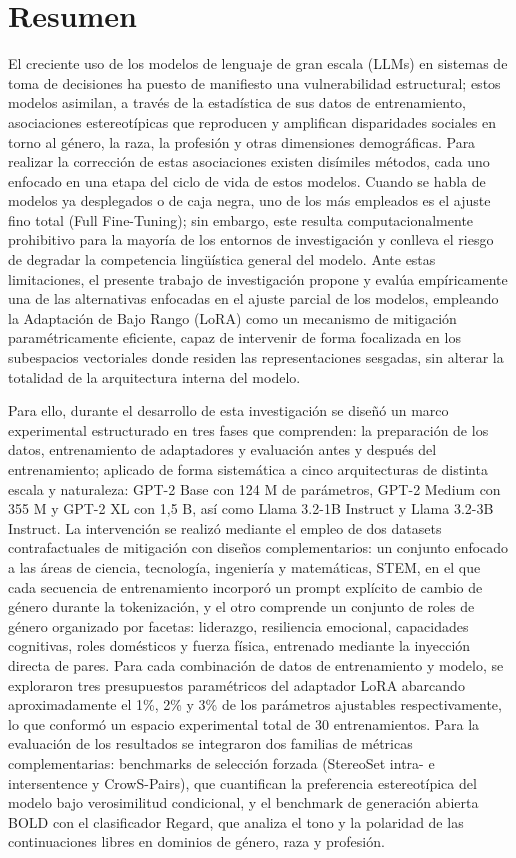 \documentclass[12pt,a4paper]{report}
\begin{document}
\section*{Resumen}

El creciente uso de los modelos de lenguaje de gran escala (LLMs) en sistemas de toma de decisiones ha puesto de manifiesto una vulnerabilidad estructural; estos modelos asimilan, a través de la estadística de sus datos de entrenamiento, asociaciones estereotípicas que reproducen y amplifican disparidades sociales en torno al género, la raza, la profesión y otras dimensiones demográficas. Para realizar la corrección de estas asociaciones existen disímiles métodos, cada uno enfocado en una etapa del ciclo de vida de estos modelos. Cuando se habla de modelos ya desplegados o de caja negra, uno de los más empleados es el ajuste fino total (Full Fine-Tuning); sin embargo, este resulta computacionalmente prohibitivo para la mayoría de los entornos de investigación y conlleva el riesgo de degradar la competencia lingüística general del modelo. Ante estas limitaciones, el presente trabajo de investigación propone y evalúa empíricamente una de las alternativas enfocadas en el ajuste parcial de los modelos, empleando la Adaptación de Bajo Rango (LoRA) como un mecanismo de mitigación paramétricamente eficiente, capaz de intervenir de forma focalizada en los subespacios vectoriales donde residen las representaciones sesgadas, sin alterar la totalidad de la arquitectura interna del modelo.

Para ello, durante el desarrollo de esta investigación se diseñó un marco experimental estructurado en tres fases que comprenden: la preparación de los datos, entrenamiento de adaptadores y evaluación antes y después del entrenamiento; aplicado de forma sistemática a cinco arquitecturas de distinta escala y naturaleza: GPT-2 Base con 124 M de parámetros, GPT-2 Medium con 355 M y GPT-2 XL con 1,5 B, así como Llama 3.2-1B Instruct y Llama 3.2-3B Instruct. La intervención se realizó mediante el empleo de dos datasets contrafactuales de mitigación con diseños complementarios: un conjunto enfocado a las áreas de ciencia, tecnología, ingeniería y matemáticas, STEM, en el que cada secuencia de entrenamiento incorporó un prompt explícito de cambio de género durante la tokenización, y el otro comprende un conjunto de roles de género organizado por facetas: liderazgo, resiliencia emocional, capacidades cognitivas, roles domésticos y fuerza física, entrenado mediante la inyección directa de pares. Para cada combinación de datos de entrenamiento y modelo, se exploraron tres presupuestos paramétricos del adaptador LoRA abarcando aproximadamente el 1\%, 2\% y 3\% de los parámetros ajustables respectivamente, lo que conformó un espacio experimental total de 30 entrenamientos. Para la evaluación de los resultados se integraron dos familias de métricas complementarias: benchmarks de selección forzada (StereoSet intra- e intersentence y CrowS-Pairs), que cuantifican la preferencia estereotípica del modelo bajo verosimilitud condicional, y el benchmark de generación abierta BOLD con el clasificador Regard, que analiza el tono y la polaridad de las continuaciones libres en dominios de género, raza y profesión.
\end{document}
